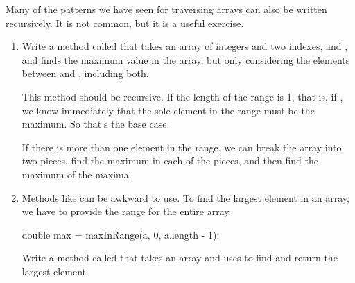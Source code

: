 \begin{exercise}  %

Many of the patterns we have seen for traversing arrays can also be written recursively.
It is not common, but it is a useful exercise.

\begin{enumerate}

\item Write a method called  that takes an array of integers and two indexes,  and , and finds the maximum value in the array, but only considering the elements between  and , including both.

This method should be recursive.
If the length of the range is 1, that is, if , we know immediately that the sole element in the range must be the maximum.
So that's the base case.

If there is more than one element in the range, we can break the array into two pieces, find the maximum in each of the pieces, and then find the maximum of the maxima.

\item Methods like  can be awkward to use.
To find the largest element in an array, we have to provide the range for the entire array.

\begin{code}
double max = maxInRange(a, 0, a.length - 1);
\end{code}

Write a method called  that takes an array and uses  to find and return the largest element.

\end{enumerate}

\end{exercise}


